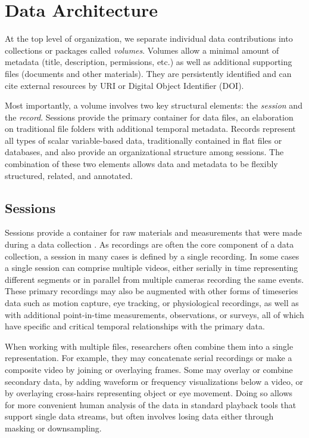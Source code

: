 \documentclass{sig-alternate}
\begin{document}
\section{Data Architecture}

At the top level of organization, we separate individual data contributions into collections or packages called \emph{volumes}.
Volumes allow a minimal amount of metadata (title, description, permissions, etc.) as well as additional supporting files (documents and other materials).
They are persistently identified and can cite external resources by URI or Digital Object Identifier (DOI).

Most importantly, a volume involves two key structural elements: the \emph{session} and the \emph{record}.
Sessions provide the primary container for data files, an elaboration on traditional file folders with additional temporal metadata.
Records represent all types of scalar variable-based data, traditionally contained in flat files or databases, and also provide an organizational structure among sessions.
The combination of these two elements allows data and metadata to be flexibly structured, related, and annotated.

\subsection{Sessions}

Sessions provide a container for raw materials and measurements that were made during a data collection \cite{Bakeman_2012}.
As recordings are often the core component of a data collection, a session in many cases is defined by a single recording.
In some cases a single session can comprise multiple videos, either serially in time representing different segments or in parallel from multiple cameras recording the same events.
These primary recordings may also be augmented with other forms of timeseries data such as motion capture, eye tracking, or physiological recordings, as well as with additional point-in-time measurements, observations, or surveys, all of which have specific and critical temporal relationships with the primary data.

When working with multiple files, researchers often combine them into a single representation.
For example, they may concatenate serial recordings or make a composite video by joining or overlaying frames.
Some may overlay or combine secondary data, by adding waveform or frequency visualizations below a video, or by overlaying cross-hairs representing object or eye movement.
Doing so allows for more convenient human analysis of the data in standard playback tools that support single data streams, but often involves losing data either through masking or downsampling.
\end{document}
